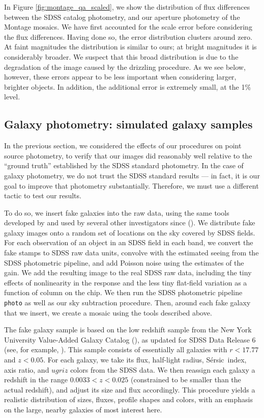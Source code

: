 \documentclass[10pt,preprint]{aastex}
\newcommand{\Sersic}{S\'ersic}
\begin{document}
In Figure \ref{fig:montage_qa_scaled}, we show the distribution of
flux differences between the SDSS catalog photometry, and our aperture
photometry of the Montage mosaics. We have first accounted for the
scale error before considering the flux differences. Having done so,
the error distribution clusters around zero.  At faint magnitudes the
distribution is similar to ours; at bright magnitudes it is
considerably broader. We suspect that this broad distribution is due
to the degradation of the image caused by the drizzling procedure. As
we see below, however, these errors appear to be less important when
considering larger, brighter objects. In addition, the additional
error is extremely small, at the 1\% level.

\subsection{Galaxy photometry: simulated galaxy samples}
\label{sec:fakegal}

In the previous section, we considered the effects of our procedures
on point source photometry, to verify that our images did reasonably
well relative to the ``ground truth'' established by the SDSS standard
photometry.  In the case of galaxy photometry, we do not trust the
SDSS standard results --- in fact, it is our goal to improve that
photometry substantially.  Therefore, we must use a different tactic
to test our results.

To do so, we insert fake galaxies into the raw data, using the same
tools developed by \citet{blanton05b} and used by several other
investigators since (\citealt{blanton04b, mandelbaum06a, masjedi06a}).
We distribute fake galaxy images onto a random set of locations on the
sky covered by SDSS fields. For each observation of an object in an
SDSS field in each band, we convert the fake stamps to SDSS raw data
units, convolve with the estimated seeing from the SDSS photometric
pipeline, and add Poisson noise using the estimates of the gain. We
add the resulting image to the real SDSS raw data, including the tiny
effects of nonlinearity in the response and the less tiny flat-field
variation as a function of column on the chip. We then run the SDSS
photometric pipeline {\tt photo} as well as our sky subtraction
procedure.  Then, around each fake galaxy that we insert, we create a
mosaic using the tools described above.

The fake galaxy sample is based on the low redshift sample from the
New York University Value-Added Galaxy Catalog (\citealt{blanton05a}),
as updated for SDSS Data Release 6 (see, for example,
\citealt{zhu10a}). This sample consists of essentially all galaxies
with $r<17.77$ and $z<0.05$.  For each galaxy, we take its flux,
half-light radius, \Sersic\ index, axis ratio, and $ugriz$ colors from
the SDSS data. We then reassign each galaxy a redshift in the range
$0.0033<z<0.025$ (constrained to be smaller than the actual redshift),
and adjust its size and flux accordingly.  This procedure yields a
realistic distribution of sizes, fluxes, profile shapes and colors,
with an emphasis on the large, nearby galaxies of most interest here.
\end{document}
